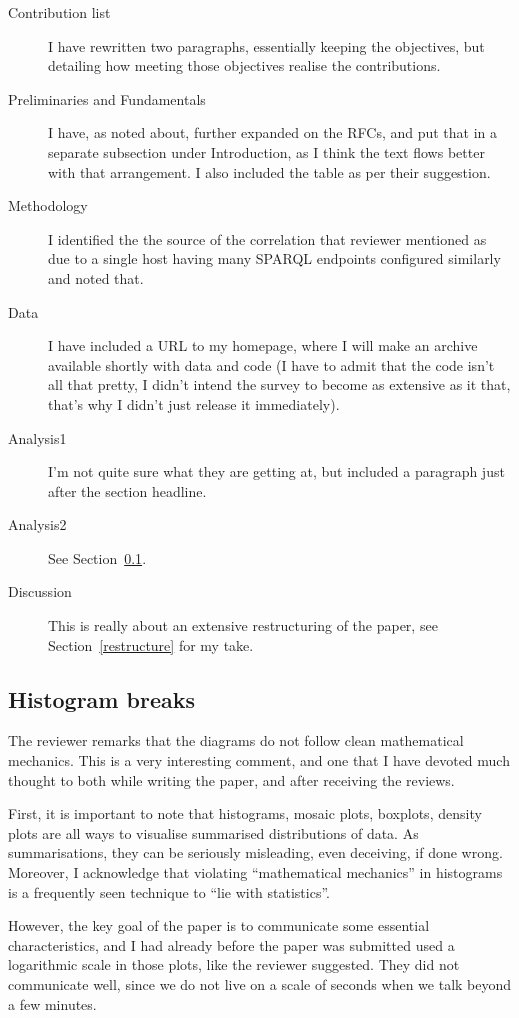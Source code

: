\documentclass{article}
\begin{document}
\begin{description}
\item [Contribution list] I have rewritten two paragraphs, essentially
  keeping the objectives, but detailing how meeting those objectives
  realise the contributions.
\item [Preliminaries and Fundamentals] I have, as noted about, further
  expanded on the RFCs, and put that in a separate subsection under
  Introduction, as I think the text flows better with that
  arrangement. I also included the table as per their suggestion.
\item [Methodology] I identified the the source of the correlation
  that reviewer mentioned as due to a single host having many SPARQL
  endpoints configured similarly and noted that.
\item [Data] I have included a URL to my homepage, where I will make
  an archive available shortly with data and code (I have to admit
  that the code isn't all that pretty, I didn't intend the survey to
  become as extensive as it that, that's why I didn't just release it
  immediately).
\item [Analysis1] I'm not quite sure what they are getting at, but
  included a paragraph just after the section headline.
\item [Analysis2] See Section~\ref{histogramstuff}.
\item [Discussion] This is really about an extensive restructuring of
  the paper, see Section~\ref{restructure} for my take.
\end{description}

\subsection{Histogram breaks}\label{histogramstuff}

The reviewer remarks that the diagrams do not follow clean
mathematical mechanics. This is a very interesting comment, and one
that I have devoted much thought to both while writing the paper, and
after receiving the reviews. 

First, it is important to note that histograms, mosaic plots,
boxplots, density plots are all ways to visualise summarised
distributions of data. As summarisations, they can be seriously
misleading, even deceiving, if done wrong. Moreover, I acknowledge
that violating ``mathematical mechanics'' in histograms is a
frequently seen technique to ``lie with statistics''. 

However, the key goal of the paper is to communicate some essential
characteristics, and I had already before the paper was submitted used
a logarithmic scale in those plots, like the reviewer suggested. They
did not communicate well, since we do not live on a scale of seconds
when we talk beyond a few minutes.
\end{document}
